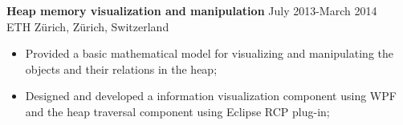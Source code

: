 \documentclass[margin, 10pt]{res} %
\begin{document}
\begin{resume}
\begin{CJK}{UTF8}{gbsn}

\textbf{Heap memory visualization and manipulation} \hfill July 2013-March 2014\\
ETH Zürich, Zürich, Switzerland
\begin{itemize} \itemsep -2pt %
\item Provided a basic mathematical model for visualizing and manipulating the objects and their relations in the heap;
\item Designed and developed a information visualization component using WPF and the heap traversal component using Eclipse RCP plug-in;
\end{itemize} 




\end{CJK}
\end{resume}
\end{document}
